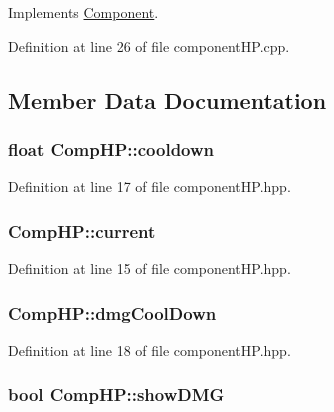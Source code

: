 Implements \hyperlink{class_component_a20c791684d452b36fcce40ac9038c735}{Component}.



Definition at line 26 of file component\-H\-P.\-cpp.



\subsection{Member Data Documentation}
\hypertarget{class_comp_h_p_a1946ec230c8eb0fa9dbb06c77480e3d7}{
\subsubsection[{cooldown}]{\setlength{\rightskip}{0pt plus 5cm}float Comp\-H\-P\-::cooldown}}\label{class_comp_h_p_a1946ec230c8eb0fa9dbb06c77480e3d7}


Definition at line 17 of file component\-H\-P.\-hpp.

\hypertarget{class_comp_h_p_ad7362fb888f908d500cb2f9478ebd653}{
\subsubsection[{current}]{ Comp\-H\-P\-::current}}\label{class_comp_h_p_ad7362fb888f908d500cb2f9478ebd653}


Definition at line 15 of file component\-H\-P.\-hpp.

\hypertarget{class_comp_h_p_a4cf56ce54ce503843ddfcd71bd5c2f32}{
\subsubsection[{dmg\-Cool\-Down}]{ Comp\-H\-P\-::dmg\-Cool\-Down}}\label{class_comp_h_p_a4cf56ce54ce503843ddfcd71bd5c2f32}


Definition at line 18 of file component\-H\-P.\-hpp.

\hypertarget{class_comp_h_p_a91b1dfaf9488d5402e4a6db7384f0732}{
\subsubsection[{show\-D\-M\-G}]{\setlength{\rightskip}{0pt plus 5cm}bool Comp\-H\-P\-::show\-D\-M\-G}}\label{class_comp_h_p_a91b1dfaf9488d5402e4a6db7384f0732}


